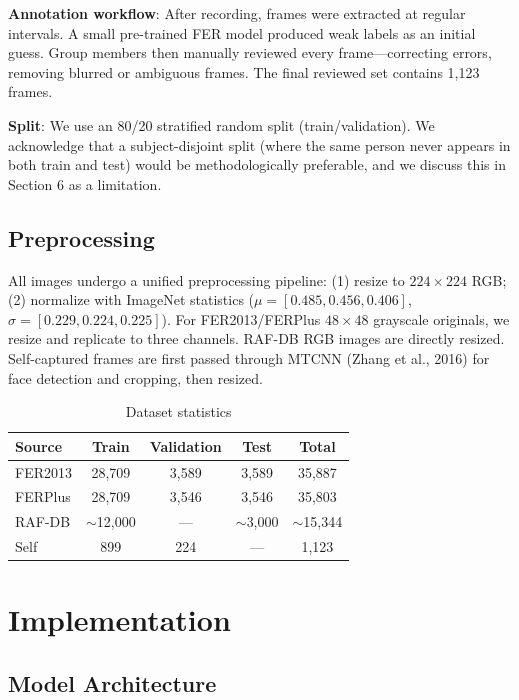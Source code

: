 \documentclass[12pt,a4paper]{article}
\begin{document}
\textbf{Annotation workflow}: After recording, frames were extracted at regular intervals. A small pre-trained FER model produced weak labels as an initial guess. Group members then manually reviewed every frame---correcting errors, removing blurred or ambiguous frames. The final reviewed set contains 1,123 frames.

\textbf{Split}: We use an 80/20 stratified random split (train/validation). We acknowledge that a subject-disjoint split (where the same person never appears in both train and test) would be methodologically preferable, and we discuss this in Section 6 as a limitation.

\subsection{Preprocessing}

All images undergo a unified preprocessing pipeline: (1) resize to $224\times224$ RGB; (2) normalize with ImageNet statistics ($\mu=[0.485, 0.456, 0.406]$, $\sigma=[0.229, 0.224, 0.225]$). For FER2013/FERPlus $48\times48$ grayscale originals, we resize and replicate to three channels. RAF-DB RGB images are directly resized. Self-captured frames are first passed through MTCNN (Zhang et al., 2016) for face detection and cropping, then resized.

\begin{table}[H]
\centering
\caption{Dataset statistics}
\begin{tabular}{lcccc}
\toprule
Source & Train & Validation & Test & Total \\
\midrule
FER2013 & 28,709 & 3,589 & 3,589 & 35,887 \\
FERPlus & 28,709 & 3,546 & 3,546 & 35,803 \\
RAF-DB  & $\sim$12,000 & — & $\sim$3,000 & $\sim$15,344 \\
Self    & 899 & 224 & — & 1,123 \\
\bottomrule
\end{tabular}
\end{table}

\section{Implementation}

\subsection{Model Architecture}
\end{document}
